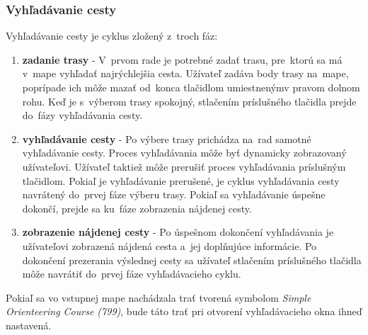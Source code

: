 \documentclass[12pt,a4paper]{report}
\begin{document}
\subsubsection{Vyhľadávanie cesty}

\begin{figure}[h]\centering
{}
\end{figure}

Vyhľadávanie cesty je cyklus zložený z~troch fáz:
\begin{enumerate}
    \item \textbf{zadanie trasy} - V~prvom rade je potrebné zadať trasu, pre~ktorú sa má v~mape vyhľadať najrýchlejšia cesta. Užívateľ zadáva body trasy na~mape, poprípade ich môže mazať od~konca tlačidlom umiestnenýmv pravom dolnom rohu. Keď je s~výberom trasy spokojný, stlačením príslušného tlačidla prejde do~fázy vyhľadávania cesty.
    \item \textbf{vyhľadávanie cesty} - Po výbere trasy prichádza na~rad samotné vyhľadávanie cesty. Proces vyhľadávania môže byť dynamicky zobrazovaný užívateľovi. Užívateľ taktiež môže prerušiť proces vyhľadávania príslušným tlačidlom. Pokiaľ je vyhľadávanie prerušené, je cyklus vyhľadávania cesty navrátený do~prvej fáze výberu trasy. Pokiaľ sa vyhľadávanie úspešne dokončí, prejde sa ku~fáze zobrazenia nájdenej cesty.
    \item \textbf{zobrazenie nájdenej cesty} - Po úspešnom dokončení vyhľadávania je užívateľovi zobrazená nájdená cesta a~jej doplňujúce informácie. Po dokončení prezerania výslednej cesty sa užívateľ stlačením príslušného tlačidla môže navrátiť do~prvej fáze vyhľadávacieho cyklu.
\end{enumerate}

Pokiaľ sa vo vstupnej mape nachádzala trať tvorená symbolom \textit{Simple Orienteering Course (799)}, bude táto trať pri otvorení vyhľadávacieho okna ihneď nastavená.
\end{document}
